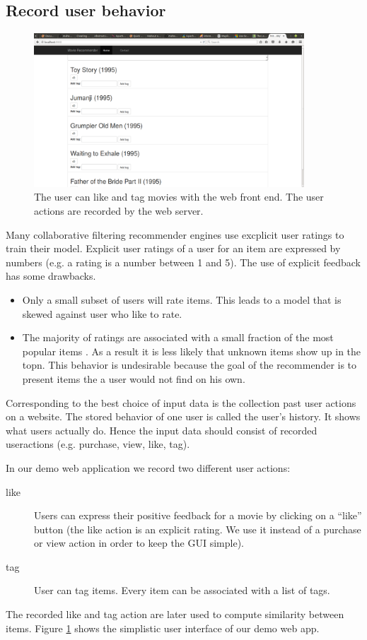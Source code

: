 \subsection{Record user behavior}
\label{sec:inputdata}

\begin{figure}
  \centering
     \includegraphics[width=0.9\textwidth]{collectinginput}
  \caption{The user can like and tag movies with the web front end. The user actions are recorded by the web server.}
  \label{fig:gui}
\end{figure}

Many collaborative filtering recommender engines use excplicit user ratings to train their model. Explicit user ratings of a user for an item are expressed by numbers (e.g. a rating is a number between 1 and 5). The use of explicit feedback has some drawbacks.
\begin{itemize}
\item Only a small subset of users will rate items. This leads to a model that is skewed against user who like to rate.
\item The majority of ratings are associated with a small fraction of the most popular items \cite{Anderson}. As a result it is less likely that unknown items show up in the \gls{topn}. This behavior is undesirable because the goal of the recommender is to present items the a user would not find on his own.
\end{itemize}

Corresponding to \cite{Dunning14} the best choice of input data is the collection past user actions on a website. The stored behavior of one user is called the user's \gls{history}. It shows what users actually do. Hence the input data should consist of recorded \glspl{useraction} (e.g. purchase, view, like, tag).

In our demo web application we record two different user actions:
\begin{description}
\item[like]  Users can express their positive feedback for a movie by clicking on a ``like'' button (the \gls{like} action is an explicit rating. We use it instead of a purchase or view action in order to keep the GUI simple).
\item[tag] User can \gls{tag} items. Every item can be associated with a list of \glspl{tag}.
\end{description}
The recorded like and tag action are later used to compute similarity between items.
Figure \ref{fig:gui} shows the simplistic user interface of our demo web app.

